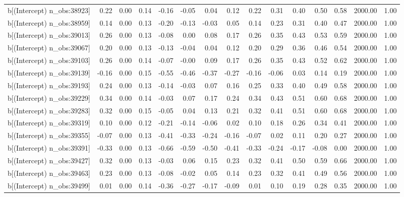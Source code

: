 \begin{table}[ht]
\begin{tabular}{rrrrrrrrrrrrrrr}
  b[(Intercept) n\_obs:38923] & 0.22 & 0.00 & 0.14 & -0.16 & -0.05 & 0.04 & 0.12 & 0.22 & 0.31 & 0.40 & 0.50 & 0.58 & 2000.00 & 1.00 \\ 
  b[(Intercept) n\_obs:38959] & 0.14 & 0.00 & 0.13 & -0.20 & -0.13 & -0.03 & 0.05 & 0.14 & 0.23 & 0.31 & 0.40 & 0.47 & 2000.00 & 1.00 \\ 
  b[(Intercept) n\_obs:39013] & 0.26 & 0.00 & 0.13 & -0.08 & 0.00 & 0.08 & 0.17 & 0.26 & 0.35 & 0.43 & 0.53 & 0.59 & 2000.00 & 1.00 \\ 
  b[(Intercept) n\_obs:39067] & 0.20 & 0.00 & 0.13 & -0.13 & -0.04 & 0.04 & 0.12 & 0.20 & 0.29 & 0.36 & 0.46 & 0.54 & 2000.00 & 1.00 \\ 
  b[(Intercept) n\_obs:39103] & 0.26 & 0.00 & 0.14 & -0.07 & -0.00 & 0.09 & 0.17 & 0.26 & 0.35 & 0.43 & 0.52 & 0.62 & 2000.00 & 1.00 \\ 
  b[(Intercept) n\_obs:39139] & -0.16 & 0.00 & 0.15 & -0.55 & -0.46 & -0.37 & -0.27 & -0.16 & -0.06 & 0.03 & 0.14 & 0.19 & 2000.00 & 1.00 \\ 
  b[(Intercept) n\_obs:39193] & 0.24 & 0.00 & 0.13 & -0.14 & -0.03 & 0.07 & 0.16 & 0.25 & 0.33 & 0.40 & 0.49 & 0.58 & 2000.00 & 1.00 \\ 
  b[(Intercept) n\_obs:39229] & 0.34 & 0.00 & 0.14 & -0.03 & 0.07 & 0.17 & 0.24 & 0.34 & 0.43 & 0.51 & 0.60 & 0.68 & 2000.00 & 1.00 \\ 
  b[(Intercept) n\_obs:39283] & 0.32 & 0.00 & 0.15 & -0.05 & 0.04 & 0.13 & 0.21 & 0.32 & 0.41 & 0.51 & 0.60 & 0.68 & 2000.00 & 1.00 \\ 
  b[(Intercept) n\_obs:39319] & 0.10 & 0.00 & 0.12 & -0.21 & -0.14 & -0.06 & 0.02 & 0.10 & 0.18 & 0.26 & 0.34 & 0.41 & 2000.00 & 1.00 \\ 
  b[(Intercept) n\_obs:39355] & -0.07 & 0.00 & 0.13 & -0.41 & -0.33 & -0.24 & -0.16 & -0.07 & 0.02 & 0.11 & 0.20 & 0.27 & 2000.00 & 1.00 \\ 
  b[(Intercept) n\_obs:39391] & -0.33 & 0.00 & 0.13 & -0.66 & -0.59 & -0.50 & -0.41 & -0.33 & -0.24 & -0.17 & -0.08 & 0.00 & 2000.00 & 1.00 \\ 
  b[(Intercept) n\_obs:39427] & 0.32 & 0.00 & 0.13 & -0.03 & 0.06 & 0.15 & 0.23 & 0.32 & 0.41 & 0.50 & 0.59 & 0.66 & 2000.00 & 1.00 \\ 
  b[(Intercept) n\_obs:39463] & 0.23 & 0.00 & 0.13 & -0.08 & -0.02 & 0.05 & 0.14 & 0.23 & 0.32 & 0.41 & 0.49 & 0.56 & 2000.00 & 1.00 \\ 
  b[(Intercept) n\_obs:39499] & 0.01 & 0.00 & 0.14 & -0.36 & -0.27 & -0.17 & -0.09 & 0.01 & 0.10 & 0.19 & 0.28 & 0.35 & 2000.00 & 1.00 \\ 

\end{tabular}
\end{table}
